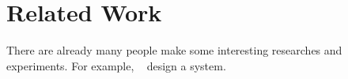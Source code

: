 \section{Related Work} \label{sec:relatedWork}

There are already many people make some interesting researches and experiments. For example, ~\cite{ruia2016flowcache} design a system.